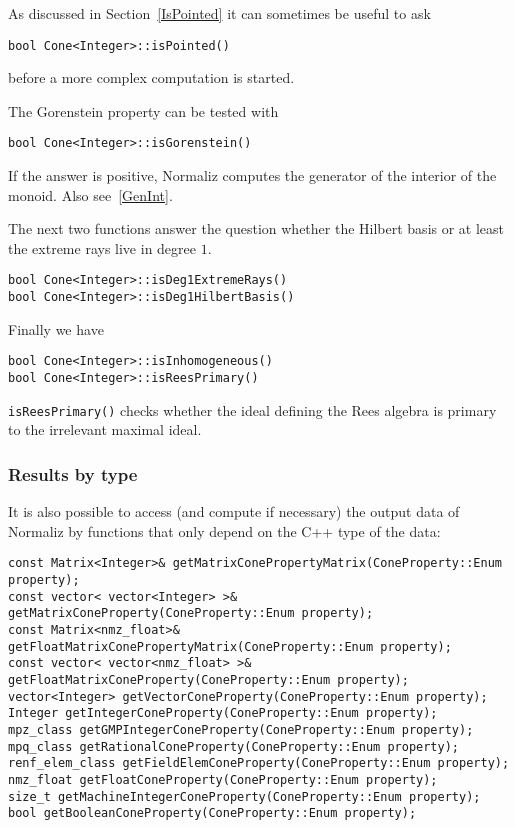 \documentclass[12pt,a4paper]{scrartcl}
\theoremstyle{definition}
\begin{document}
\begin{small}
As discussed in Section~\ref{IsPointed} it can sometimes be useful to ask
\begin{Verbatim}
bool Cone<Integer>::isPointed()
\end{Verbatim}
before a more complex computation is started.

The Gorenstein property can be tested with
\begin{Verbatim}
bool Cone<Integer>::isGorenstein()
\end{Verbatim}
If the answer is positive, Normaliz computes the generator of the interior of the monoid. Also see~\ref{GenInt}.


The next two functions answer the question whether the Hilbert basis or at least the extreme rays live in degree $1$.
\begin{Verbatim}
bool Cone<Integer>::isDeg1ExtremeRays()
bool Cone<Integer>::isDeg1HilbertBasis()
\end{Verbatim}

Finally we have
\begin{Verbatim}
bool Cone<Integer>::isInhomogeneous()
bool Cone<Integer>::isReesPrimary()
\end{Verbatim}
\verb|isReesPrimary()| checks whether the ideal defining the Rees algebra is primary to the irrelevant maximal ideal.


\subsubsection{Results by type}\label{ByType}

It is also possible to access (and compute if necessary) the output data of Normaliz by functions that only depend on the C++ type of the data:

\begin{Verbatim}
const Matrix<Integer>& getMatrixConePropertyMatrix(ConeProperty::Enum property);
const vector< vector<Integer> >& getMatrixConeProperty(ConeProperty::Enum property);
const Matrix<nmz_float>& getFloatMatrixConePropertyMatrix(ConeProperty::Enum property);
const vector< vector<nmz_float> >& getFloatMatrixConeProperty(ConeProperty::Enum property);
vector<Integer> getVectorConeProperty(ConeProperty::Enum property);
Integer getIntegerConeProperty(ConeProperty::Enum property);
mpz_class getGMPIntegerConeProperty(ConeProperty::Enum property);
mpq_class getRationalConeProperty(ConeProperty::Enum property);
renf_elem_class getFieldElemConeProperty(ConeProperty::Enum property);
nmz_float getFloatConeProperty(ConeProperty::Enum property);
size_t getMachineIntegerConeProperty(ConeProperty::Enum property);
bool getBooleanConeProperty(ConeProperty::Enum property);
\end{Verbatim}


\end{small}
\end{document}
